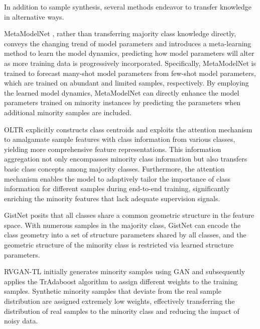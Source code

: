 In addition to sample synthesis, several methods endeavor to transfer knowledge in alternative ways.

MetaModelNet \cite{wang2017learning}, rather than transferring majority class knowledge directly, conveys the changing trend of model parameters and introduces a meta-learning method to learn the model dynamics, predicting how model parameters will alter as more training data is progressively incorporated. Specifically, MetaModelNet is trained to forecast many-shot model parameters from few-shot model parameters, which are trained on abundant and limited samples, respectively. By employing the learned model dynamics, MetaModelNet can directly enhance the model parameters trained on minority instances by predicting the parameters when additional minority samples are included.

OLTR \cite{liu2019large} explicitly constructs class centroids and exploits the attention mechanism to amalgamate sample features with class information from various classes, yielding more comprehensive feature representations. This information aggregation not only encompasses minority class information but also transfers basic class concepts among majority classes. Furthermore, the attention mechanism enables the model to adaptively tailor the importance of class information for different samples during end-to-end training, significantly enriching the minority features that lack adequate supervision signals.


GistNet \cite{liu2021gistnet} posits that all classes share a common geometric structure in the feature space. With numerous samples in the majority class, GistNet can encode the class geometry into a set of structure parameters shared by all classes, and the geometric structure of the minority class is restricted via learned structure parameters.

RVGAN-TL \cite{ding2023rvgan} initially generates minority samples using GAN and subsequently applies the TrAdaboost algorithm \cite{tradaboost} to assign different weights to the training samples. Synthetic minority samples that deviate from the real sample distribution are assigned extremely low weights, effectively transferring the distribution of real samples to the minority class and reducing the impact of noisy data.



